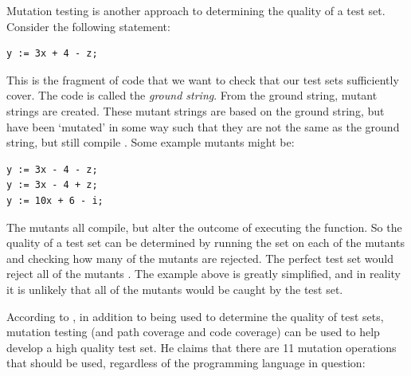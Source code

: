 Mutation testing is another approach to determining the quality of a test set. Consider the following statement:

\begin{lstlisting}
y := 3x + 4 - z;
\end{lstlisting}

This is the fragment of code that we want to check that our test sets sufficiently cover. The code is called the \emph{ground string}. From the ground string, mutant strings are created. These mutant strings are based on the ground string, but have been `mutated' in some way such that they are not the same as the ground string, but still compile \citep{softwareTestingIntro}. Some example mutants might be:

\begin{lstlisting}
y := 3x - 4 - z;
y := 3x - 4 + z;
y := 10x + 6 - i;
\end{lstlisting}

The mutants all compile, but alter the outcome of executing the function. So the quality of a test set can be determined by running the set on each of the mutants and checking how many of the mutants are rejected. The perfect test set would reject all of the mutants \citep{softwareTestingIntro}. The example above is greatly simplified, and in reality it is unlikely that all of the mutants would be caught by the test set.

According to \citet{softwareTestingIntro}, in addition to being used to determine the quality of test sets, mutation testing (and path coverage and code coverage) can be used to help develop a high quality test set. He claims that there are 11 mutation operations that should be used, regardless of the programming language in question:

